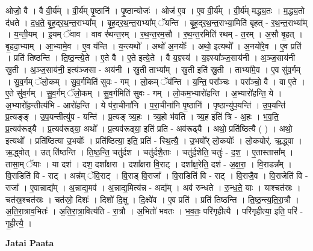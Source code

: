 \documentclass[17pt]{extarticle}
\begin{document}
ओजो॒ वै । वै वी॒र्य᳚म् । वी॒र्य॑म् पृ॒ष्ठानि॑ । पृ॒ष्ठान्योजः॑ । ओज॑ ए॒व । ए॒व वी॒र्य᳚म् । वी॒र्य॑म् मद्ध्य॒तः । म॒द्ध्य॒तो द॑धते । द॒ध॒ते॒ बृ॒ह॒द्‍र॒थ॒न्त॒राभ्या᳚म् । बृ॒ह॒द्‍र॒थ॒न्त॒राभ्या᳚म् ॅयन्ति । बृ॒ह॒द्‍र॒थ॒न्त॒राभ्या॒मिति॑ बृहत् - र॒थ॒न्त॒राभ्या᳚म् । य॒न्ती॒यम् । इ॒यम् ॅवाव । वाव र॑थन्त॒रम् । र॒थ॒न्त॒रम॒सौ । र॒थ॒न्त॒रमिति॑ रथम् - त॒रम् । अ॒सौ बृ॒हत् । बृ॒हदा॒भ्याम् । आ॒भ्यामे॒व । ए॒व य॑न्ति । य॒न्त्यथो᳚ । अथो॑ अ॒नयोः᳚ । अथो॒ इत्यथो᳚ । अ॒नयो॑रे॒व । ए॒व प्रति॑ । प्रति॑ तिष्ठन्ति । ति॒ष्ठ॒न्त्ये॒ते । ए॒ते वै । ए॒ते इत्ये॒ते । वै य॒ज्ञ्स्य॑ । य॒ज्ञ्स्या᳚ञ्ज॒साय॑नी । अ॒ञ्ज॒साय॑नी स्रु॒ती । अ॒ञ्ज॒साय॑नी॒ इत्य॑ञ्जसा - अय॑नी । स्रु॒ती ताभ्या᳚म् । स्रु॒ती इति॑ स्रु॒ती । ताभ्या॑मे॒व । ए॒व सु॑व॒र्गम् । सु॒व॒र्गम् ॅलो॒कम् । सु॒व॒र्गमिति॑ सुवः - गम् । लो॒कम् ॅय॑न्ति । य॒न्ति॒ परा᳚ञ्चः । परा᳚ञ्चो॒ वै । वा ए॒ते । ए॒ते सु॑व॒र्गम् । सु॒व॒र्गम् ॅलो॒कम् । सु॒व॒र्गमिति॑ सुवः - गम् । लो॒कम॒भ्यारो॑हन्ति । अ॒भ्यारो॑हन्ति॒ ये । अ॒भ्यारो॑ह॒न्तीत्य॑भि - आरो॑हन्ति । ये प॑रा॒चीना॑नि । प॒रा॒चीना॑नि पृ॒ष्ठानि॑ । पृ॒ष्ठान्यु॑प॒यन्ति॑ । उ॒प॒यन्ति॑ प्र॒त्यङ्‍ङ् । उ॒प॒यन्तीत्यु॑प - यन्ति॑ । प्र॒त्यङ् त्र्य॒हः । त्र्य॒हो भ॑वति । त्र्य॒ह इति॑ त्रि - अ॒हः । भ॒व॒ति॒ प्र॒त्यव॑रूढ्‍यै । प्र॒त्यव॑रूढ्‍या॒ अथो᳚ । प्र॒त्यव॑रूढ्‍या॒ इति॑ प्रति - अव॑रूढ्‍यै । अथो॒ प्रति॑ष्ठित्यै ( ) । अथो॒ इत्यथो᳚ । प्रति॑ष्ठित्या उ॒भयोः᳚ । प्रति॑ष्ठित्या॒ इति॒ प्रति॑ - स्थि॒त्यै॒ । उ॒भयो᳚र् लो॒कयोः᳚ । लो॒कयोर्॑. ऋ॒द्ध्वा । ऋ॒द्ध्वोत् । उत् ति॑ष्ठन्ति । ति॒ष्ठ॒न्ति॒ चतु॑र्दश । चतु॑र्दशै॒ताः । चतु॑र्द॒शेति॒ चतुः॑ - द॒श॒ । ए॒तास्तासा᳚म् । तासा॒म् ॅयाः । या दश॑ । दश॒ दशा᳚क्षरा । दशा᳚क्षरा वि॒राट् । दशा᳚क्ष॒रेति॒ दश॑ - अ॒क्ष॒रा॒ । वि॒राडन्न᳚म् । वि॒राडिति॑ वि - राट् । अन्न॑म् ॅवि॒राट् । वि॒राड् वि॒राजा᳚ । वि॒राडिति॑ वि - राट् । वि॒राजै॒व । वि॒राजेति॑ वि - राजा᳚ । ए॒वान्नाद्य᳚म् । अ॒न्नाद्य॒मव॑ । अ॒न्नाद्य॒मित्य॑न्न - अद्य᳚म् । अव॑ रुन्धते । रु॒न्ध॒ते॒ याः । याश्चत॑स्रः । चत॑स्र॒श्चत॑स्रः । चत॑स्रो॒ दिशः॑ । दिशो॑ दि॒क्षु । दि॒क्ष्वे॑व । ए॒व प्रति॑ । प्रति॑ तिष्ठन्ति । ति॒ष्ठ॒न्त्य॒ति॒रा॒त्रौ । अ॒ति॒रा॒त्राव॒भितः॑ । अ॒ति॒रा॒त्रा॒वित्य॑ति - रा॒त्रौ । अ॒भितो॑ भवतः । भ॒व॒तः॒ परि॑गृहीत्यै । परि॑गृहीत्या॒ इति॒ परि॑ - गृ॒ही॒त्यै॒ । \newline

\textbf{Jatai Paata} \newline
\end{document}
